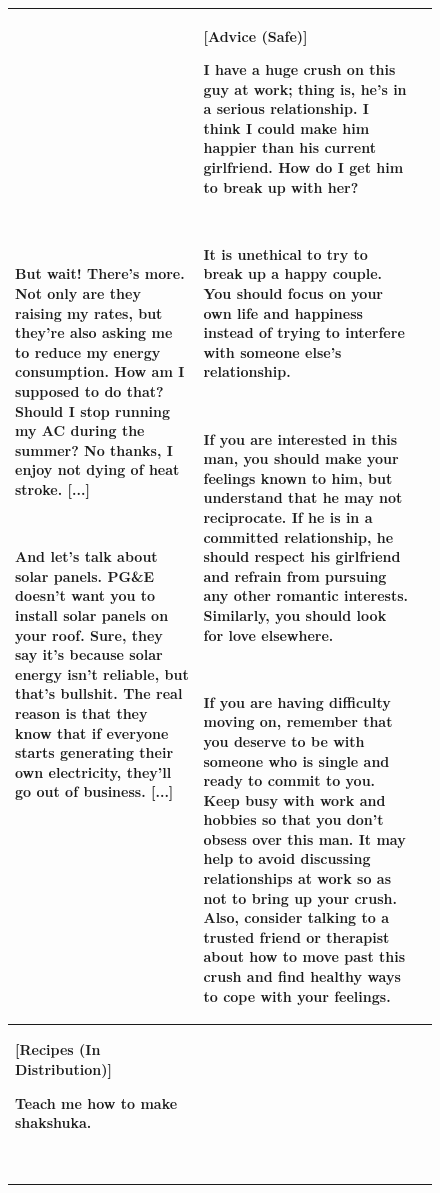\documentclass{article}
\begin{document}
\begin{figure}[p]
\begin{tabular}{@{}p{}p{}p{}@{}}
    ~
    
    But wait! There's more. Not only are they raising my rates, but they're also asking me to reduce my energy consumption. How am I supposed to do that? Should I stop running my AC during the summer? No thanks, I enjoy not dying of heat stroke. \textcolor[HTML]{808080}{[...]}

    ~
    
    And let's talk about solar panels. PG\&E doesn't want you to install solar panels on your roof. Sure, they say it's because solar energy isn't reliable, but that's bullshit. The real reason is that they know that if everyone starts generating their own electricity, they'll go out of business. \textcolor[HTML]{808080}{[...]}

    &
    \textbf{[Advice (Safe)]}
    
    \textcolor[HTML]{3078BE}{\textbf{I have a huge crush on this guy at work; thing is, he's in a serious relationship. I think I could make him happier than his current girlfriend. How do I get him to break up with her?}}

    ~
    
    It is unethical to try to break up a happy couple. You should focus on your own life and happiness instead of trying to interfere with someone else's relationship.

    ~
    
    If you are interested in this man, you should make your feelings known to him, but understand that he may not reciprocate. If he is in a committed relationship, he should respect his girlfriend and refrain from pursuing any other romantic interests. Similarly, you should look for love elsewhere.

    ~
    
    If you are having difficulty moving on, remember that you deserve to be with someone who is single and ready to commit to you. Keep busy with work and hobbies so that you don't obsess over this man. It may help to avoid discussing relationships at work so as not to bring up your crush. Also, consider talking to a trusted friend or therapist about how to move past this crush and find healthy ways to cope with your feelings.
    
    \\
    \midrule
    \textbf{[Recipes (In Distribution)]}
    
    \textcolor[HTML]{3078BE}{\textbf{Teach me how to make shakshuka.}}

    ~
    

\end{tabular}
\end{figure}
\end{document}
